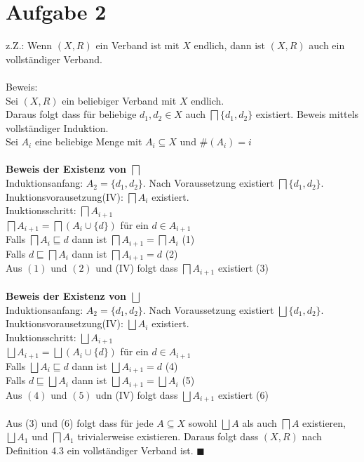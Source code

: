 \section*{Aufgabe 2}

z.Z.: Wenn $(X,R)$ ein Verband ist mit $X$ endlich, dann ist $(X,R)$ auch ein vollständiger Verband.\\\\
Beweis:\\
Sei $(X,R)$ ein beliebiger Verband mit $X$ endlich.\\
Daraus folgt dass für beliebige $d_1, d_2 \in X$ auch $\bigsqcap \{d_1,d_2\}$ existiert.
Beweis mittels vollständiger Induktion.\\
Sei $A_i$ eine beliebige Menge mit $A_i \subseteq X$ und $\#(A_i) = i$\\\\
\textbf{Beweis der Existenz von $\bigsqcap$}\\
Induktionsanfang: $A_2 = \{d_1,d_2\}$. Nach Voraussetzung existiert $\bigsqcap \{d_1,d_2\}$.\\
Inuktionsvorausetzung(IV): $\bigsqcap A_i$ existiert.\\
Inuktionsschritt: $\bigsqcap A_{i+1}$ \\
$\bigsqcap A_{i+1} = \bigsqcap(A_{i} \cup \{d\})$ für ein $d \in A_{i+1}$\\
Falls $\bigsqcap A_{i} \sqsubseteq d$ dann ist $\bigsqcap A_{i+1} = \bigsqcap A_{i}$ (1)\\
Falls $d \sqsubseteq \bigsqcap A_{i}$ dann ist $\bigsqcap A_{i+1} = d$ (2)\\
Aus $(1)$ und $(2)$ und (IV) folgt dass $\bigsqcap A_{i+1}$ existiert (3)\\\\
\textbf{Beweis der Existenz von $\bigsqcup$}\\
Induktionsanfang: $A_2 = \{d_1,d_2\}$. Nach Voraussetzung existiert $\bigsqcup \{d_1,d_2\}$.\\
Inuktionsvorausetzung(IV): $\bigsqcup A_i$ existiert.\\
Inuktionsschritt: $\bigsqcup A_{i+1}$ \\
$\bigsqcup A_{i+1} = \bigsqcup(A_{i} \cup \{d\})$ für ein $d \in A_{i+1}$\\
Falls $\bigsqcup A_{i} \sqsubseteq d$ dann ist $\bigsqcup A_{i+1} = d$ (4)\\
Falls $d \sqsubseteq \bigsqcup A_{i}$ dann ist $\bigsqcup A_{i+1} = \bigsqcup A_{i}$ (5)\\
Aus $(4)$ und $(5)$ udn (IV) folgt dass $\bigsqcup A_{i+1}$ existiert (6)\\\\
Aus (3) und (6) folgt dass für jede $A \subseteq X$ sowohl  $\bigsqcup A$ als auch $\bigsqcap A$ existieren, $\bigsqcup A_1$  und $\bigsqcap A_1$ trivialerweise existieren. Daraus folgt dass $(X,R)$ nach Definition 4.3 ein vollständiger Verband ist. $\blacksquare$